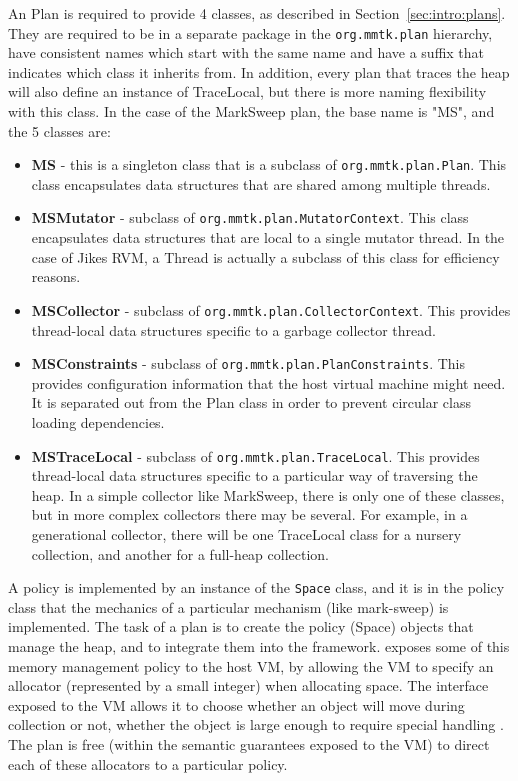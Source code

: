 An \mmtk Plan is required to provide 4 classes, as described in
Section~\ref{sec:intro:plans}.
They are required to be in a separate package in the \lstinline|org.mmtk.plan|
hierarchy, have consistent names which start with the same name and have a
suffix that indicates which class it inherits from.
In addition, every plan that traces the heap will also define an instance of
TraceLocal, but there is more naming flexibility with this class.
In the case of the MarkSweep plan, the base name is "MS", and the 5 classes
are:
\begin{itemize}
\item \textbf{MS} - this is a singleton class that is a subclass of
\lstinline|org.mmtk.plan.Plan|.
This class encapsulates data structures that are shared among multiple threads.
\item \textbf{MSMutator} - subclass of \lstinline|org.mmtk.plan.MutatorContext|. 
This class encapsulates data structures that are local to a single mutator thread.  
In the case of Jikes RVM, a Thread is actually a subclass of this class for efficiency reasons.
\item \textbf{MSCollector} - subclass of
\lstinline|org.mmtk.plan.CollectorContext|.
This provides thread-local data structures specific to a garbage collector thread.
\item \textbf{MSConstraints} - subclass of
\lstinline|org.mmtk.plan.PlanConstraints|.
This provides configuration information that the host virtual machine might need.  
It is separated out from the Plan class in order to prevent circular class loading dependencies.
\item \textbf{MSTraceLocal} - subclass of \lstinline|org.mmtk.plan.TraceLocal|. 
This provides thread-local data structures specific to a particular way of traversing the heap.  
In a simple collector like MarkSweep, there is only one of these classes, 
but in more complex collectors there may be several.  For example, in a generational collector, 
there will be one TraceLocal class for a nursery collection, and another for a full-heap collection.
\end{itemize}

A policy is implemented
by an instance of the \lstinline|Space| class, and it is in the policy class
that the mechanics of a particular mechanism (like mark-sweep) is implemented.  
The task of a plan is to create the policy (Space) objects that manage the heap, 
and to integrate them into the \mmtk framework.  
\mmtk exposes some of this memory management policy to the host VM, 
by allowing the VM to specify an allocator 
(represented by a small integer) when allocating space.  
The interface exposed to the VM allows it to choose whether an object 
will move during collection or not, whether the object is 
large enough to require special handling \etc.  
The \mmtk plan is free (within the semantic guarantees exposed to the VM) 
to direct each of these allocators to a particular policy.

